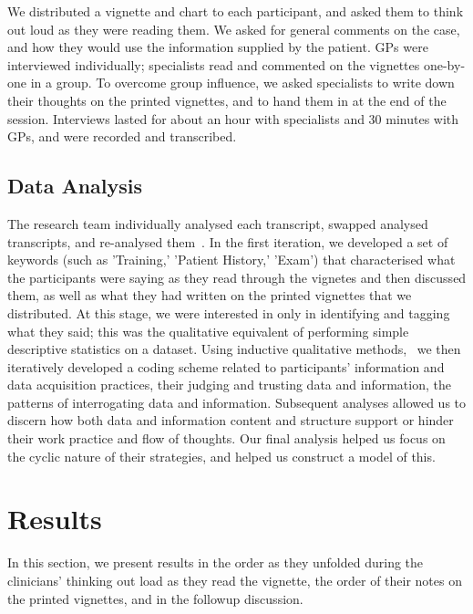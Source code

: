 \documentclass{sigchi}
\begin{document}
We distributed a vignette and chart to each participant, and asked them to think out loud as they were reading them.  We asked for general comments on the case, and how they would use the information supplied by the patient.  GPs were interviewed individually; specialists read and commented on the vignettes one-by-one in a group.  To overcome group influence, we asked specialists to write down their thoughts on the printed vignettes, and to hand them in at the end of the session.  Interviews lasted for about an hour with specialists and 30 minutes with GPs, and were recorded and transcribed.

\subsection{Data Analysis}
The research team individually analysed each transcript, swapped analysed transcripts, and re-analysed them~\cite{pope2000qualitative}.  In the first iteration, we developed a set of keywords (such as 'Training,' 'Patient History,' 'Exam') that characterised what the participants were saying as they read through the vignetes and then discussed them, as well as what they had written on the printed vignettes that we distributed. At this stage, we were interested in only in identifying and tagging what they said; this was the qualitative equivalent of performing simple descriptive statistics on a dataset.  Using inductive qualitative methods,~\cite{corbin2014basics} we then iteratively developed a coding scheme related to participants' information and data acquisition practices, their judging and trusting data and information, the patterns of interrogating data and information. Subsequent analyses allowed us to discern how both data and information content and structure support or hinder their work practice and flow of thoughts.  Our final analysis helped us focus on the cyclic nature of their strategies, and helped us construct a model of this.


\section{Results}

\newcommand{\bigquote}[2]{
    \begin{quote}
        #1~--~\textit{#2}
    \end{quote}
}

In this section, we present results in the order as they unfolded during the clinicians' thinking out load as they read the vignette, the order of their notes on the printed vignettes, and in the followup discussion.
    
\end{document}
